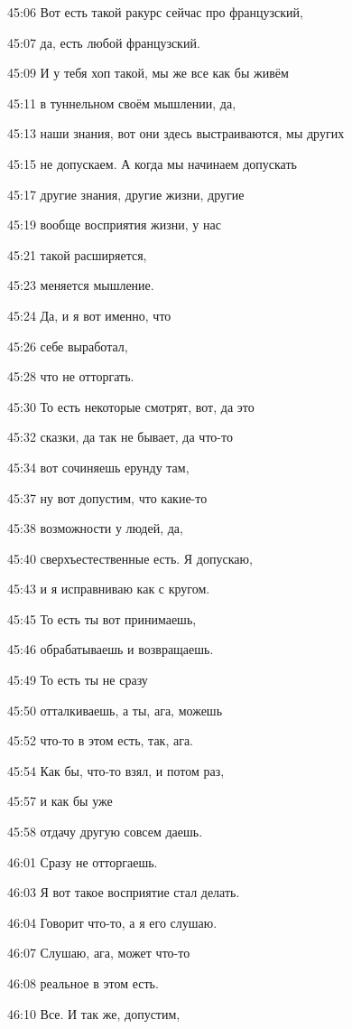 45:06
Вот есть такой ракурс сейчас про французский,

45:07
да, есть любой французский.

45:09
И у тебя хоп такой, мы же все как бы живём

45:11
в туннельном своём мышлении, да,

45:13
наши знания, вот они здесь выстраиваются, мы других

45:15
не допускаем. А когда мы начинаем допускать

45:17
другие знания, другие жизни, другие

45:19
вообще восприятия жизни, у нас

45:21
такой расширяется,

45:23
меняется мышление.

45:24
Да, и я вот именно, что

45:26
себе выработал,

45:28
что не отторгать.

45:30
То есть некоторые смотрят, вот, да это

45:32
сказки, да так не бывает, да что-то

45:34
вот сочиняешь ерунду там,

45:37
ну вот допустим, что какие-то

45:38
возможности у людей, да,

45:40
сверхъестественные есть. Я допускаю,

45:43
и я исправниваю как с кругом.

45:45
То есть ты вот принимаешь,

45:46
обрабатываешь и возвращаешь.

45:49
То есть ты не сразу

45:50
отталкиваешь, а ты, ага, можешь

45:52
что-то в этом есть, так, ага.

45:54
Как бы, что-то взял, и потом раз,

45:57
и как бы уже

45:58
отдачу другую совсем даешь.

46:01
Сразу не отторгаешь.

46:03
Я вот такое восприятие стал делать.

46:04
Говорит что-то, а я его слушаю.

46:07
Слушаю, ага, может что-то

46:08
реальное в этом есть.

46:10
Все. И так же, допустим,

